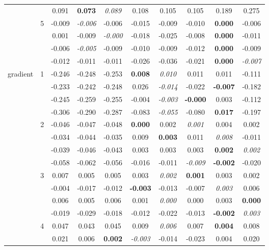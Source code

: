 \documentclass[authoryear, review, 11pt]{elsarticle}
\begin{document}
\begin{table}
\begin{center}
{\begin{tabular}{cccccccccc}
&  & 0.091 & \textbf{0.073} & \emph{0.089} & 0.108 & 0.105 & 0.105 & 0.189 & 0.275 \\ 
		  \cline{3-10}
		  & \multirow{4}{*}{5} & -0.009 & \emph{-0.006} & -0.006 & -0.015 & -0.009 & -0.010 & \textbf{0.000} & -0.006 \\ 
&  & 0.001 & -0.009 & \emph{-0.000} & -0.018 & -0.025 & -0.008 & \textbf{0.000} & -0.011 \\ 
&  & -0.006 & \emph{-0.005} & -0.009 & -0.010 & -0.009 & -0.012 & \textbf{0.000} & -0.009 \\ 
&  & -0.012 & -0.011 & -0.011 & -0.026 & -0.036 & -0.021 & \textbf{0.000} & \emph{-0.007} \\ 
		  \hline
		  \multirow{20}{*}{gradient} & \multirow{4}{*}{1} & -0.246 & -0.248 & -0.253 & \textbf{0.008} & \emph{0.010} & 0.011 & 0.011 & -0.111 \\ 
&  & -0.233 & -0.242 & -0.248 & 0.026 & \emph{-0.014} & -0.022 & \textbf{-0.007} & -0.182 \\ 
&  & -0.245 & -0.259 & -0.255 & -0.004 & \emph{-0.003} & \textbf{-0.000} & 0.003 & -0.112 \\ 
&  & -0.306 & -0.290 & -0.287 & -0.083 & \emph{-0.055} & -0.080 & \textbf{0.017} & -0.197 \\ 
		  \cline{3-10}
		  & \multirow{4}{*}{2} & -0.046 & -0.047 & -0.048 & \textbf{0.000} & 0.002 & \emph{0.001} & 0.004 & 0.002 \\ 
&  & -0.034 & -0.044 & -0.035 & 0.009 & \textbf{0.003} & 0.011 & \emph{0.008} & -0.011 \\ 
&  & -0.039 & -0.046 & -0.043 & 0.003 & 0.003 & 0.003 & \textbf{0.002} & \emph{0.002} \\ 
&  & -0.058 & -0.062 & -0.056 & -0.016 & -0.011 & \emph{-0.009} & \textbf{-0.002} & -0.020 \\
		  \cline{3-10}
		  & \multirow{4}{*}{3} & 0.007 & 0.005 & 0.005 & 0.003 & \emph{0.002} & \textbf{0.001} & 0.003 & 0.002 \\ 
&  & -0.004 & -0.017 & -0.012 & \textbf{-0.003} & -0.013 & -0.007 & \emph{0.003} & 0.006 \\ 
&  & 0.006 & 0.005 & 0.006 & 0.001 & \emph{0.000} & 0.000 & 0.003 & \textbf{0.000} \\ 
&  & -0.019 & -0.029 & -0.018 & -0.012 & -0.022 & -0.013 & \textbf{-0.002} & \emph{0.003} \\ 
		  \cline{3-10}
		  & \multirow{4}{*}{4} & 0.047 & 0.043 & 0.045 & 0.009 & \emph{0.006} & 0.007 & \textbf{0.004} & 0.008 \\ 
&  & 0.021 & 0.006 & \textbf{0.002} & \emph{-0.003} & -0.014 & -0.023 & 0.004 & 0.020 \\ 

\end{tabular}}
\end{center}
\end{table}
\end{document}
